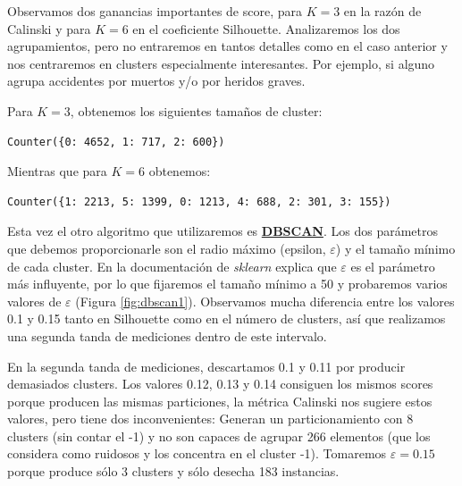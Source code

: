 \documentclass[oneside]{book}
\begin{document}
Observamos dos ganancias importantes de score, para $K=3$ en la razón
de Calinski y para $K=6$ en el coeficiente Silhouette. Analizaremos
los dos agrupamientos, pero no entraremos en tantos detalles como en
el caso anterior y nos centraremos en clusters especialmente
interesantes. Por ejemplo, si alguno agrupa accidentes por muertos y/o
por heridos graves.

Para $K=3$, obtenemos los siguientes tamaños de cluster:
\begin{verbatim}
Counter({0: 4652, 1: 717, 2: 600})
\end{verbatim}

Mientras que para $K=6$ obtenemos:
\begin{verbatim}
Counter({1: 2213, 5: 1399, 0: 1213, 4: 688, 2: 301, 3: 155})
\end{verbatim}

Esta vez el otro algoritmo que utilizaremos es
\href{https://scikit-learn.org/stable/modules/generated/sklearn.cluster.DBSCAN.html}{\textbf{DBSCAN}}. Los
dos parámetros que debemos proporcionarle son el radio máximo
(epsilon, $\varepsilon$) y el tamaño mínimo de cada cluster. En la
documentación de \textit{sklearn} explica que $\varepsilon$ es el
parámetro más influyente, por lo que fijaremos el tamaño mínimo a 50 y
probaremos varios valores de $\varepsilon$ (Figura
\ref{fig:dbscan1}). Observamos mucha diferencia entre los valores 0.1
y 0.15 tanto en Silhouette como en el número de clusters, así que
realizamos una segunda tanda de mediciones dentro de este intervalo.

En la segunda tanda de mediciones, descartamos 0.1 y 0.11 por producir
demasiados clusters. Los valores 0.12, 0.13 y 0.14 consiguen los
mismos scores porque producen las mismas particiones, la métrica
Calinski nos sugiere estos valores, pero tiene dos inconvenientes:
Generan un particionamiento con 8 clusters (sin contar el -1) y no son
capaces de agrupar 266 elementos (que los considera como ruidosos y
los concentra en el cluster -1). Tomaremos $\varepsilon=0.15$ porque
produce sólo 3 clusters y sólo desecha 183 instancias. 
\end{document}
